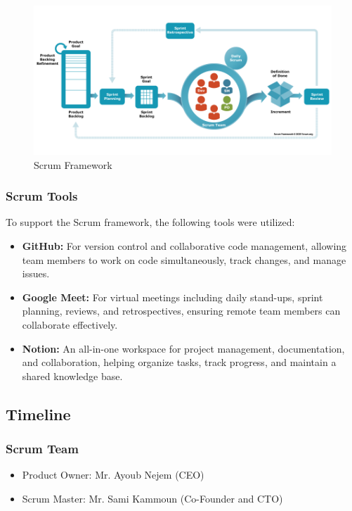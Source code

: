 \begin{figure}[h]
  \centering
  \includegraphics[width=1\textwidth]{Images/scrum.png}
  \caption{Scrum Framework}
  \label{fig:Scrum Framework}
\end{figure}

\subsubsection{Scrum Tools}
To support the Scrum framework, the following tools were utilized:
\begin{itemize}
    \item \textbf{GitHub:} For version control and collaborative code management, allowing team members to work on code simultaneously, track changes, and manage issues.
    \item \textbf{Google Meet:} For virtual meetings including daily stand-ups, sprint planning, reviews, and retrospectives, ensuring remote team members can collaborate effectively.
    \item \textbf{Notion:} An all-in-one workspace for project management, documentation, and collaboration, helping organize tasks, track progress, and maintain a shared knowledge base.
\end{itemize}

\newpage

\subsection{Timeline}
\subsubsection{Scrum Team}
\begin{itemize}
    \item Product Owner: Mr. Ayoub Nejem (CEO)
    \item Scrum Master: Mr. Sami Kammoun (Co-Founder and CTO)
\end{itemize}

